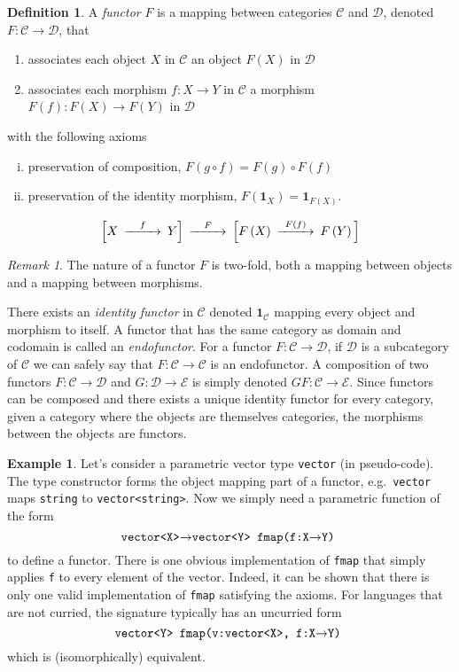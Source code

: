 \documentclass[11pt,a4paper]{scrartcl}
\newcommand{\of}[1]{\left(#1\right)}
\newcommand{\idm}[1]{\mathbf{1}_{#1}}
\newcommand{\cdef}[1]{\emph{#1}}
\newcommand{\code}[1]{\texttt{#1}}
\theoremstyle{plain}
\theoremstyle{definition}
\newtheorem{defn}{Definition}
\newtheorem{exmp}{Example}
\theoremstyle{remark}
\newtheorem*{remark}{Remark}
\begin{document}
\begin{defn}
A \cdef{functor} $F$ is a mapping between categories $\mathcal{C}$ and $\mathcal{D}$, denoted $F\colon \mathcal{C} \to \mathcal{D}$, that 
\begin{enumerate}
	\item associates each object $X$ in $\mathcal{C}$ an object $F(X)$ in $\mathcal{D}$
	\item associates each morphism $f\colon X \to Y$ in $\mathcal{C}$ a morphism $F(f)\colon F(X) \to F(Y)$ in $\mathcal{D}$
\end{enumerate}
with the following axioms
\begin{enumerate}[(i)]
	\item preservation of composition, $F(g \circ f) = F(g) \circ F(f)$
	\item preservation of the identity morphism, $F(\idm{X}) = \idm{F(X)}$.
\end{enumerate}
\end{defn}

\begin{displaymath}
\begin{CD}
	\Big[ X @>{f}>> Y \Big] @>{F}>> \Big[ F\of X @>{F\of f}>> F\of Y \Big]
\end{CD}
\end{displaymath}

\begin{remark}
The nature of a functor $F$ is two-fold, both a mapping between objects and a mapping between morphisms.
\end{remark}

There exists an \cdef{identity functor} in $\mathcal{C}$ denoted $\idm{\mathcal{C}}$ mapping every object and morphism to itself. A functor that has the same category as domain and codomain is called an \cdef{endofunctor}. For a functor $F\colon \mathcal{C} \to \mathcal{D}$, if $\mathcal{D}$ is a subcategory of $\mathcal{C}$ we can safely say that $F\colon \mathcal{C} \to \mathcal{C}$ is an endofunctor. A composition of two functors $F\colon \mathcal{C} \to \mathcal{D}$ and $G\colon \mathcal{D} \to \mathcal{E}$ is simply denoted $GF\colon \mathcal{C} \to \mathcal{E}$. Since functors can be composed and there exists a unique identity functor for every category, given a category where the objects are themselves categories, the morphisms between the objects are functors.

\begin{exmp}
	Let's consider a parametric vector type \code{vector} (in pseudo-code). The type constructor forms the object mapping part of a functor, e.g.\ \code{vector} maps \code{string} to \code{vector<string>}. Now we simply need a parametric function of the form 
	\[\text{\code{vector<X>$\to$vector<Y> fmap(f:X$\to$Y)} }\]
	to define a functor. There is one obvious implementation of \code{fmap} that simply applies \code{f} to every element of the vector. Indeed, it can be shown that there is only one valid implementation of \code{fmap} satisfying the axioms. For languages that are not curried, the signature typically has an uncurried form 
	\[\text{\code{vector<Y> fmap(v:vector<X>, f:X$\to$Y)} }\]
	which is (isomorphically) equivalent.
\end{exmp}
\end{document}
